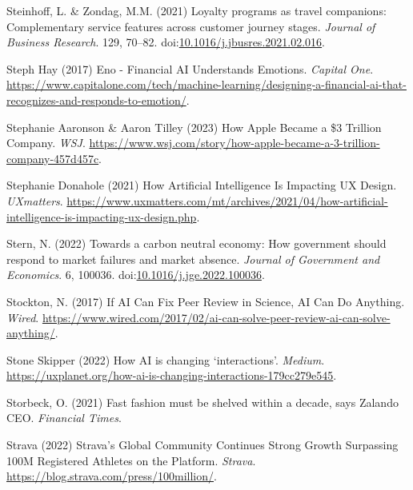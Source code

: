 \documentclass[
  letterpaper,
  DIV=11,
  numbers=noendperiod]{scrartcl}
\newlength{\cslhangindent}
\newenvironment{CSLReferences}[2] %
 {\begin{list}{}{%
  \setlength{\itemindent}{0pt}
  \setlength{\leftmargin}{0pt}
  \setlength{\parsep}{0pt}
  \ifodd #1
   \setlength{\leftmargin}{\cslhangindent}
   \setlength{\itemindent}{-1\cslhangindent}
  \fi
  \setlength{\itemsep}{#2\baselineskip}}}
 {\end{list}}
\begin{document}
\begin{CSLReferences}{0}{1}
Steinhoff, L. \& Zondag, M.M. (2021) Loyalty programs as travel
companions: {Complementary} service features across customer journey
stages. \emph{Journal of Business Research}. 129, 70--82.
doi:\href{https://doi.org/10.1016/j.jbusres.2021.02.016}{10.1016/j.jbusres.2021.02.016}.

Steph Hay (2017) Eno - {Financial AI Understands Emotions}.
\emph{Capital One}.
\url{https://www.capitalone.com/tech/machine-learning/designing-a-financial-ai-that-recognizes-and-responds-to-emotion/}.

Stephanie Aaronson \& Aaron Tilley (2023) How {Apple Became} a \$3
{Trillion Company}. \emph{WSJ}.
\url{https://www.wsj.com/story/how-apple-became-a-3-trillion-company-457d457c}.

Stephanie Donahole (2021) How {Artificial Intelligence Is Impacting UX
Design}. \emph{UXmatters}.
\url{https://www.uxmatters.com/mt/archives/2021/04/how-artificial-intelligence-is-impacting-ux-design.php}.

Stern, N. (2022) Towards a carbon neutral economy: {How} government
should respond to market failures and market absence. \emph{Journal of
Government and Economics}. 6, 100036.
doi:\href{https://doi.org/10.1016/j.jge.2022.100036}{10.1016/j.jge.2022.100036}.

Stockton, N. (2017) If {AI Can Fix Peer Review} in {Science}, {AI Can Do
Anything}. \emph{Wired}.
\url{https://www.wired.com/2017/02/ai-can-solve-peer-review-ai-can-solve-anything/}.

Stone Skipper (2022) How {AI} is changing {`interactions'}.
\emph{Medium}.
\url{https://uxplanet.org/how-ai-is-changing-interactions-179cc279e545}.

Storbeck, O. (2021) Fast fashion must be shelved within a decade, says
{Zalando CEO}. \emph{Financial Times}.

Strava (2022) Strava's {Global Community Continues Strong Growth
Surpassing 100M Registered Athletes} on the {Platform}. \emph{Strava}.
\url{https://blog.strava.com/press/100million/}.


\end{CSLReferences}
\end{document}
